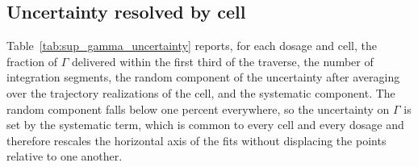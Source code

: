 \documentclass[%
  aip,
  pof,
  reprint,
  floatfix
]{revtex4-2}
\begin{document}
\subsection{Uncertainty resolved by cell}

Table~\ref{tab:sup_gamma_uncertainty} reports, for each dosage and cell, the fraction of $\Gamma$ delivered within the first third of the traverse, the number of integration segments, the random component of the uncertainty after averaging over the trajectory realizations of the cell, and the systematic component. The random component falls below one percent everywhere, so the uncertainty on $\Gamma$ is set by the systematic term, which is common to every cell and every dosage and therefore rescales the horizontal axis of the fits without displacing the points relative to one another.
\end{document}

